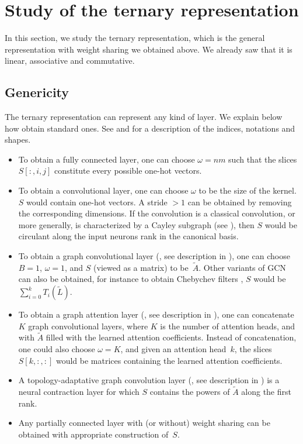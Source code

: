 \section{Study of the ternary representation}
\label{sec:ternary}

In this section, we study the ternary representation, which is the general representation with weight sharing we obtained above. We already saw that it is linear, associative and commutative.

\subsection{Genericity}


The ternary representation can represent any kind of layer. We explain below how obtain standard ones. See  and  for a description of the indices, notations and shapes.

\begin{itemize}%
\item[\ding{227}] To obtain a fully connected layer, one can choose $\omega = nm$ such that the slices $S[:,i,j]$ constitute every possible one-hot vectors.
\item[\ding{227}] To obtain a convolutional layer, one can choose $\omega$ to be the size of the kernel. $S$ would contain one-hot vectors. A stride $> 1$ can be obtained by removing the corresponding dimensions. If the convolution is a classical convolution, or more generally, is characterized by a Cayley subgraph (see ), then $S$ would be circulant along the input neurons rank in the canonical basis.
\item[\ding{227}] To obtain a graph convolutional layer (\cite{kipf2016semi}, see description in ), one can choose $B = 1$, $\omega = 1$, and $S$ (viewed as a matrix) to be~$\widetilde{A}$. Other variants of GCN can also be obtained, for instance to obtain Chebychev filters \citep{defferrard2016convolutional}, $S$ would be $\sum_{i=0}^k T_i(\widetilde{L})$.
\item[\ding{227}] To obtain a graph attention layer (\cite{velickovic2017graph}, see description in ), one can concatenate $K$ graph convolutional layers, where $K$ is the number of attention heads, and with $\widetilde{A}$ filled with the learned attention coefficients. Instead of concatenation, one could also choose $\omega=K$, and given an attention head~$k$, the slices $S[k,:,:]$ would be matrices containing the learned attention coefficients.
\item[\ding{227}] A topology-adaptative graph convolution layer (\cite{du2017topology}, see description in ) is a neural contraction layer for which $S$ contains the powers of $\widetilde{A}$ along the first rank.
\item[\ding{227}] Any partially connected layer with (or without) weight sharing can be obtained with appropriate construction of~$S$.
\end{itemize}

